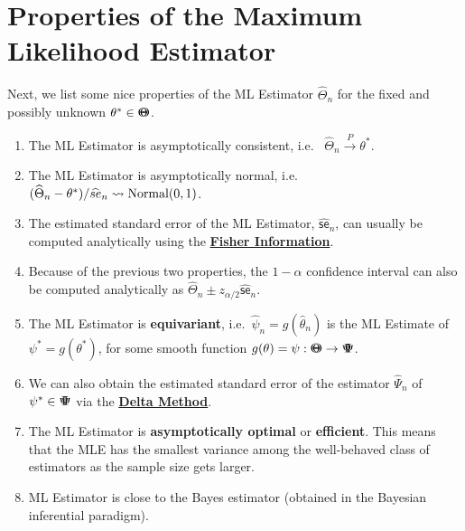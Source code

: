{\section{Properties of the Maximum Likelihood Estimator}\label{S:PropsMLE}
Next, we list some nice properties of the ML Estimator $\widehat{\Theta}_n$ for the fixed and possibly unknown $\theta^* \in {\Theta}\mspace{-11 mu}{\Theta}$.
\begin{enumerate}
\item The ML Estimator is asymptotically consistent, i.e.~
$\widehat{\Theta}_n \overset{P}{\longrightarrow} \theta^*$.
\item The ML Estimator is asymptotically normal, i.e.~
$(\widehat{\Theta}_n - \theta^*) / \widehat{se}_n \rightsquigarrow \mbox{{\rm Normal}}(0,1)$.
\item The estimated standard error of the ML Estimator, $\widehat{\mathsf{se}}_n$, can usually be computed analytically using the \hyperref[S:FisherInfo]{\bf Fisher Information}.
\item Because of the previous two properties, the $1-\alpha$ confidence interval can also be computed analytically as $\widehat{\Theta}_n \pm z_{\alpha/2} \widehat{\mathsf{se}}_n$.
\item The ML Estimator is {\bf equivariant}, i.e.~$\widehat{\psi}_n=g(\widehat{\theta}_n)$ is the ML Estimate of $\psi^*=g(\theta^*)$, for some smooth function $g(\theta)=\psi: {\Theta}\mspace{-11 mu}{\Theta} \to {\Psi}\mspace{-11 mu}{\Psi}$.  
\item We can also obtain the estimated standard error of the estimator 
$\widehat{\Psi}_n$ of $\psi^* \in {\Psi}\mspace{-11 mu}{\Psi}$ via the \hyperref[S:DeltaMethod]{\bf Delta Method}.
\item The ML Estimator is {\bf asymptotically optimal} or {\bf efficient}.  This means that the MLE has the smallest variance among the well-behaved class of estimators as the sample size gets larger.
\item ML Estimator is close to the Bayes estimator (obtained in the Bayesian inferential paradigm).
\end{enumerate}

}

